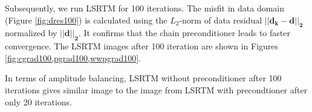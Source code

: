 %

Subsequently, we run LSRTM for 100 iterations. The misfit in data domain (Figure \ref{fig:dres100}) is calculated using the $L_2$-norm of data residual $\mathbf{|| d_k - d ||_{2}}$ normalized by $\mathbf{||d ||_{2}}$. It confirms that the chain preconditioner leads to faster convergence. The LSRTM images after 100 iteration are shown in Figures \ref{fig:cgrad100,pgrad100,wwpgrad100}. 





In terms of amplitude balancing, LSRTM without preconditioner after 100 iterations gives similar image to the image from LSRTM with precondtioner after only 20 iterations.
